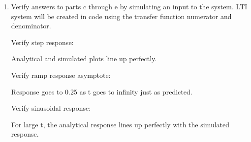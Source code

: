 \documentclass[12pt]{article}
\begin{document}
\begin{enumerate}
\begin{enumerate}
        \item Verify answers to parts c through e by simulating an input to the system. LTI system will be created in code using the transfer function numerator and denominator.
        
        Verify step response:

        \begin{center}
            
        \end{center}

        Analytical and simulated plots line up perfectly.

        Verify ramp response asymptote:

        \begin{center}
            
        \end{center}

        Response goes to 0.25 as t goes to infinity just as predicted.

        Verify sinusoidal response:

        \begin{center}
            
        \end{center}

        For large t, the analytical response lines up perfectly with the simulated response.
    \end{enumerate}
    
    
    

\end{enumerate}
\end{document}
